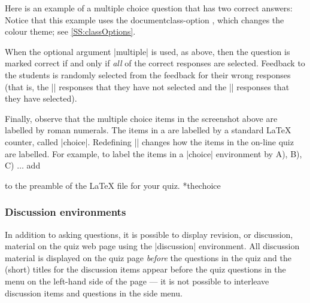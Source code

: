 \documentclass[svgnames]{article}
\makeatletter
\newcommand\macroIndex[1]{%
  \lowercase{\def\temp{#1}}%
  \expandafter\index\expandafter{\temp@\textbackslash#1}%
}
\makeatother
\begin{document}
  Here is an example of a multiple choice question that has
  two correct answers:
  Notice that this example uses the documentclass-option
  , which changes the \WebQuiz colour theme;
  see \autoref{SS:classOptions}.

  When the optional argument \LatexCode|multiple| is used, as above,
  then the question is marked correct if and only if \textit{all} of the
  correct responses are selected. Feedback to the students is randomly
  selected from the feedback for their wrong responses (that is, the
  \LatexCode|\correct| responses that they have not selected and the
  \LatexCode|\incorrect| responses that they have selected).

  Finally, observe that the multiple choice items in the screenshot
  above are labelled by roman numerals. The items in a
   are labelled by a standard \LaTeX{} counter, called
  \LatexCode|choice|. Redefining \LatexCode|\thechoice| changes how the
  items in the on-line quiz are labelled. For example, to label the
  items in a \LatexCode|choice| environment by A), B), C) $\dots$ add
  \begin{latexcode}
    \renewcommand\thechoice{\Alph{choice})}
  \end{latexcode}
  to the preamble of the \LaTeX{} file for your quiz.
  *{thechoice}\macroIndex{thechoice}

  \subsubsection{Discussion environments}\label{SS:discussion}

  In addition to asking questions, it is possible to display revision,
  or discussion, material on the quiz web page using the
  \LatexCode|discussion| environment.  All discussion material is
  displayed on the quiz page \textit{before} the questions in the quiz
  and the (short) titles for the discussion items appear before the quiz
  questions in the menu on the left-hand side of the page --- it is
  not possible to interleave discussion items and questions in the side
  menu.
\end{document}
